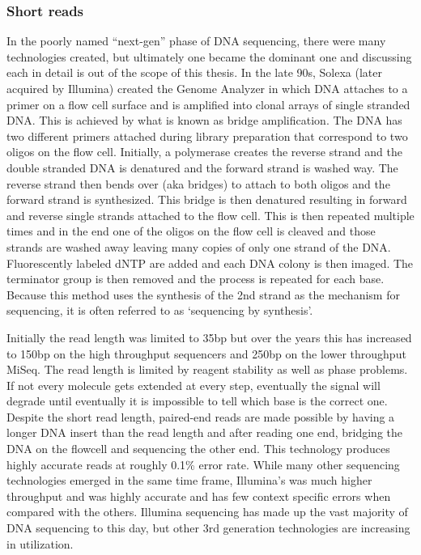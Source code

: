 \subsubsection{Short reads}\label{section:nextgen}

\par{
In the poorly named ``next-gen'' phase of DNA sequencing, there were many technologies created, but ultimately one became the dominant one and discussing each in detail is out of the scope of this thesis. In the late 90s, Solexa (later acquired by Illumina) created the Genome Analyzer in which DNA attaches to a primer on a flow cell surface and is amplified into clonal arrays of single stranded DNA\cite{flowcell}. This is achieved by what is known as bridge amplification. The DNA has two different primers attached during library preparation that correspond to two oligos on the flow cell. Initially, a polymerase creates the reverse strand and the double stranded DNA is denatured and the forward strand is washed way. The reverse strand then bends over (aka bridges) to attach to both oligos and the forward strand is synthesized. This bridge is then denatured resulting in forward and reverse single strands attached to the flow cell. This is then repeated multiple times and in the end one of the oligos on the flow cell is cleaved and those strands are washed away leaving many copies of only one strand of the DNA\cite{bridgeamp}. Fluorescently labeled dNTP are added and each DNA colony is then imaged. The terminator group is then removed\cite{reversibleterminator} and the process is repeated for each base. Because this method uses the synthesis of the 2nd strand as the mechanism for sequencing, it is often referred to as `sequencing by synthesis'. 
} 

\par{
Initially the read length was limited to 35bp but over the years this has increased to 150bp on the high throughput sequencers and 250bp on the lower throughput MiSeq. The read length is limited by reagent stability as well as phase problems. If not every molecule gets extended at every step, eventually the signal will degrade until eventually it is impossible to tell which base is the correct one. Despite the short read length, paired-end reads are made possible by having a longer DNA insert than the read length and after reading one end, bridging the DNA on the flowcell and sequencing the other end. This technology produces highly accurate reads at roughly 0.1\% error rate. While many other sequencing technologies emerged in the same time frame, Illumina's was much higher throughput and was highly accurate and has few context specific errors when compared with the others\cite{errormotifs}. Illumina sequencing has made up the vast majority of DNA sequencing to this day, but other 3rd generation technologies are increasing in utilization.
} 

